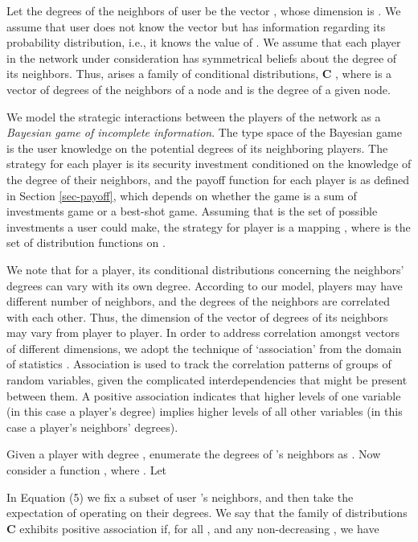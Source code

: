 \documentclass[letterpaper,12pt,onecolumn, nodraft]{IEEEtran}
\begin{document}
Let the degrees of the neighbors of user  be the vector , whose dimension is . We assume that user  does not know the vector  but has information regarding its probability distribution, i.e., it knows the value of . We assume that each player in the network under consideration has symmetrical beliefs about the degree of its neighbors. Thus, arises a family of conditional distributions, \textbf{C} , where  is a vector of degrees of the neighbors of a node and  is the degree of a given node.

We model the strategic interactions between the players of the network as a \emph{Bayesian game of incomplete information}. The type space of the Bayesian game is the user knowledge on the potential degrees of its neighboring players. The strategy for each player is its security investment conditioned on the knowledge of the degree of their neighbors, and the payoff function for each player is as defined in Section \ref{sec-payoff}, which depends on whether the game is a sum of investments game or a best-shot game. Assuming that  is the set of possible investments a user could make, the strategy for player  is a mapping , where  is the set of distribution functions on . 
  
We note that for a player, its conditional distributions concerning the neighbors' degrees can vary with its own degree. According to our model, players may have different number of neighbors, and the degrees of the neighbors are correlated with each other. Thus, the dimension of the vector of degrees of its neighbors may vary from player to player. In order to address correlation amongst vectors of different dimensions, we adopt the technique of `association' from the domain of statistics \cite{epw}. Association is used to track the correlation patterns of groups of random variables, given the complicated interdependencies that might be present between them. A positive association indicates that higher levels of one variable (in this case a player's degree) implies higher levels of all other variables (in this case a player's neighbors' degrees).  

Given a player  with degree , enumerate the degrees of 's neighbors as . Now consider a function , where . Let 

In Equation (5) we fix a subset  of user 's neighbors, and then take the expectation of  operating on their degrees. We say that the family of distributions \textbf{C} exhibits positive association if, for all , and any non-decreasing , we have 
\end{document}
